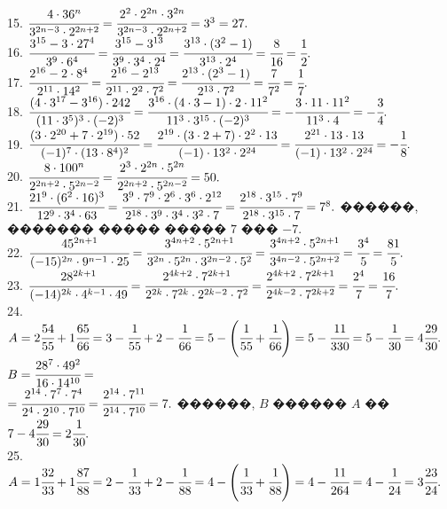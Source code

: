 \documentclass[12pt]{article}
\begin{document}
15. $\cfrac{4\cdot36^n}{3^{2n-3}\cdot2^{2n+2}}=\cfrac{2^2\cdot2^{2n}\cdot3^{2n}}{3^{2n-3}\cdot2^{2n+2}}=3^3=27.$\\
16. $\cfrac{3^{15}-3\cdot27^4}{3^9\cdot6^4}=\cfrac{3^{15}-3^{13}}{3^9\cdot3^4\cdot2^4}=\cfrac{3^{13}\cdot(3^2-1)}{3^{13}\cdot2^4}=\cfrac{8}{16}=\cfrac{1}{2}.$\\
17. $\cfrac{2^{16}-2\cdot 8^4}{2^{11}\cdot 14^2}=\cfrac{2^{16}-2^{13}}{2^{11}\cdot 2^2\cdot7^2}=\cfrac{2^{13}\cdot(2^3-1)}{2^{13}\cdot7^2}=\cfrac{7}{7^2}=\cfrac{1}{7}.$\\
18. $\cfrac{(4\cdot3^{17}-3^{16})\cdot242}{(11\cdot 3^5)^3\cdot(-2)^3}=\cfrac{3^{16}\cdot(4\cdot3-1)\cdot2\cdot11^2}{11^3\cdot 3^{15}\cdot(-2)^3}=
-\cfrac{3\cdot11\cdot11^2}{11^3\cdot4}=-\cfrac{3}{4}.$\\
19. $\cfrac{(3\cdot 2^{20}+7\cdot 2^{19})\cdot 52}{(-1)^7\cdot(13\cdot8^4)^2}=\cfrac{2^{19}\cdot(3\cdot2+7)\cdot 2^2\cdot13}{(-1)\cdot13^2\cdot2^{24}}=
\cfrac{2^{21}\cdot13\cdot13}{(-1)\cdot13^2\cdot2^{24}}=-\cfrac{1}{8}.$\\
20. $\cfrac{8\cdot100^n}{2^{2n+2}\cdot5^{2n-2}}=\cfrac{2^3\cdot2^{2n}\cdot5^{2n}}{2^{2n+2}\cdot5^{2n-2}}=50.$\\
21. $\cfrac{21^9\cdot(6^2\cdot16)^3}{12^9\cdot3^4\cdot63}=\cfrac{3^9\cdot7^9\cdot2^6\cdot3^6\cdot2^{12}}{2^{18}\cdot3^9\cdot3^4\cdot3^2\cdot7}=
\cfrac{2^{18}\cdot3^{15}\cdot7^9}{2^{18}\cdot3^{15}\cdot7}=7^8.$ ������, ������� ����� ����� $7$ ��� $-7.$\\
22. $\cfrac{45^{2n+1}}{(-15)^{2n}\cdot 9^{n-1}\cdot25}=\cfrac{3^{4n+2}\cdot5^{2n+1}}{3^{2n}\cdot5^{2n}\cdot 3^{2n-2}\cdot5^2}=
\cfrac{3^{4n+2}\cdot5^{2n+1}}{3^{4n-2}\cdot5^{2n+2}}=\cfrac{3^4}{5}=\cfrac{81}{5}.$\\
23. $\cfrac{28^{2k+1}}{(-14)^{2k}\cdot4^{k-1}\cdot49}=\cfrac{2^{4k+2}\cdot7^{2k+1}}{2^{2k}\cdot7^{2k}\cdot2^{2k-2}\cdot7^2}=
\cfrac{2^{4k+2}\cdot7^{2k+1}}{2^{4k-2}\cdot7^{2k+2}}=\cfrac{2^4}{7}=\cfrac{16}{7}.$\\
24. $A=2\cfrac{54}{55}+1\cfrac{65}{66}=3-\cfrac{1}{55}+2-\cfrac{1}{66}=5-\left(\cfrac{1}{55}+\cfrac{1}{66}\right)=5-\cfrac{11}{330}=5-\cfrac{1}{30}=4\cfrac{29}{30}.$
$B=\cfrac{28^7\cdot49^2}{16\cdot14^{10}}=$\\$=\cfrac{2^{14}\cdot7^{7}\cdot7^4}{2^4\cdot2^{10}\cdot7^{10}}=\cfrac{2^{14}\cdot7^{11}}{2^{14}\cdot7^{10}}=7.$ ������, $B$ ������ $A$ �� $7-4\cfrac{29}{30}=2\cfrac{1}{30}.$\\
25. $A=1\cfrac{32}{33}+1\cfrac{87}{88}=2-\cfrac{1}{33}+2-\cfrac{1}{88}=4-\left(\cfrac{1}{33}+\cfrac{1}{88}\right)=4-\cfrac{11}{264}=4-\cfrac{1}{24}=3\cfrac{23}{24}.$
\end{document}
